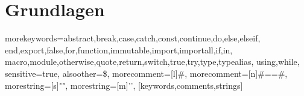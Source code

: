 \chapter{Grundlagen} \label{ch:grundlagen}

%
  {morekeywords={abstract,break,case,catch,const,continue,do,else,elseif,%
      end,export,false,for,function,immutable,import,importall,if,in,%
      macro,module,otherwise,quote,return,switch,true,try,type,typealias,%
      using,while},%
   sensitive=true,%
   alsoother={\$},%
   morecomment=[l]#,%
   morecomment=[n]{#=}{=#},%
   morestring=[s]{"}{"},%
   morestring=[m]{'}{'},%
}[keywords,comments,strings]%

















